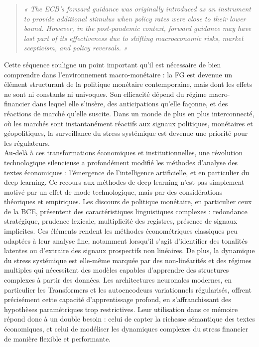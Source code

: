 \begin{quote}
\textit{« The ECB’s forward guidance was originally introduced as an instrument to provide additional stimulus when policy rates were close to their lower bound. However, in the post-pandemic context, forward guidance may have lost part of its effectiveness due to shifting macroeconomic risks, market scepticism, and policy reversals. »}
\hfill \citep{hofmann2024ecb}
\end{quote}

Cette séquence souligne un point important qu'il est nécessaire de bien comprendre dans l'environnement macro-monétaire : la FG est devenue un élément structurant de la politique monétaire contemporaine, mais dont les effets ne sont ni constants ni univoques. Son efficacité dépend du régime macro-financier dans lequel elle s’insère, des anticipations qu’elle façonne, et des réactions de marché qu’elle suscite. Dans un monde de plus en plus interconnecté, où les marchés sont instantanément réactifs aux signaux politiques, monétaires et géopolitiques, la surveillance du stress systémique est devenue une priorité pour les régulateurs.\\

Au-delà à ces transformations économiques et institutionnelles, une révolution technologique silencieuse a profondément modifié les méthodes d’analyse des textes économiques : l’émergence de l’intelligence artificielle, et en particulier du deep learning. Ce recours aux méthodes de deep learning n’est pas simplement motivé par un effet de mode technologique, mais par des considérations théoriques et empiriques. Les discours de politique monétaire, en particulier ceux de la BCE, présentent des caractéristiques linguistiques complexes : redondance stratégique, prudence lexicale, multiplicité des registres, présence de signaux implicites. Ces éléments rendent les méthodes économétriques classiques peu adaptées à leur analyse fine, notamment lorsqu’il s’agit d’identifier des tonalités latentes ou d’extraire des signaux prospectifs non linéaires. De plus, la dynamique du stress systémique est elle-même marquée par des non-linéarités et des régimes multiples qui nécessitent des modèles capables d’apprendre des structures complexes à partir des données. Les architectures neuronales modernes, en particulier les Transformers et les autoencodeurs variationnels régularisés, offrent précisément cette capacité d’apprentissage profond, en s’affranchissant des hypothèses paramétriques trop restrictives. Leur utilisation dans ce mémoire répond donc à un double besoin : celui de capter la richesse sémantique des textes économiques, et celui de modéliser les dynamiques complexes du stress financier de manière flexible et performante.\\

